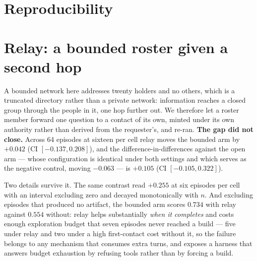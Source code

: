
\section{Reproducibility}

\section{Relay: a bounded roster given a second hop}
\label{app:relay}
A bounded network here addresses twenty holders and no others, which is a truncated
directory rather than a private network: information reaches a closed group through the
people in it, one hop further out. We therefore let a roster member forward one question
to a contact of its own, minted under its own authority rather than derived from the
requester's, and re-ran. \textbf{The gap did not close.} Across 64 episodes at sixteen per
cell relay moves the bounded arm by $+0.042$ (CI $[-0.137, 0.208]$), and the
difference-in-differences against the open arm --- whose configuration is identical under
both settings and which serves as the negative control, moving $-0.063$ --- is $+0.105$
(CI $[-0.105, 0.322]$).

Two details survive it. The same contrast read $+0.255$ at six episodes per cell with an
interval excluding zero and decayed monotonically with $n$. And excluding episodes that
produced no artifact, the bounded arm scores $0.734$ with relay against $0.554$ without:
relay helps substantially \emph{when it completes} and costs enough exploration budget
that seven episodes never reached a build --- five under relay and two under a high
first-contact cost without it, so the failure belongs to any mechanism that consumes extra
turns, and exposes a harness that answers budget exhaustion by refusing tools rather than
by forcing a build.
